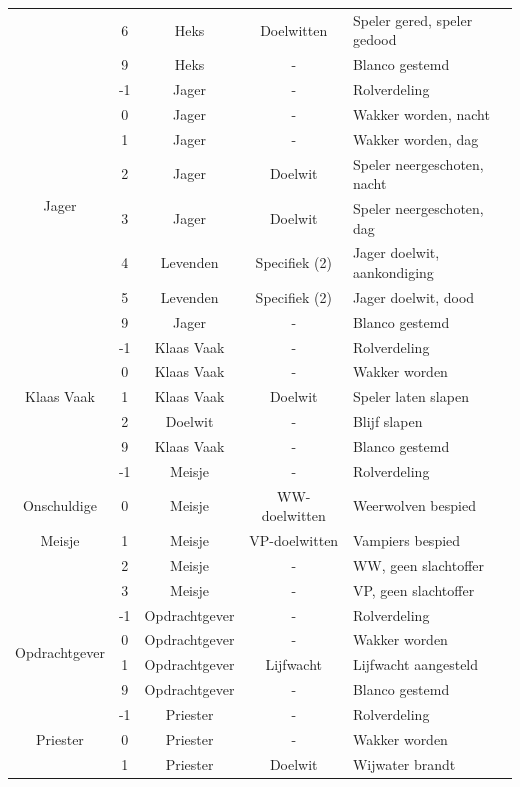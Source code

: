 \documentclass[12pt]{article}
\begin{document}
\begin{center}
\begin{longtable}{c|c|c|c|l}
       & 6 & Heks & Doelwitten & Speler gered, speler gedood \\
       & 9 & Heks & - & Blanco gestemd \\
      \hline
      \multirow{8}{*}{Jager} & -1 & Jager & - & Rolverdeling \\
       & 0 & Jager & - & Wakker worden, nacht \\
       & 1 & Jager & - & Wakker worden, dag \\
       & 2 & Jager & Doelwit & Speler neergeschoten, nacht \\
       & 3 & Jager & Doelwit & Speler neergeschoten, dag \\
       & 4 & Levenden & Specifiek (2) & Jager doelwit, aankondiging \\
       & 5 & Levenden & Specifiek (2) & Jager doelwit, dood \\
       & 9 & Jager & - & Blanco gestemd \\
      \hline
      \multirow{5}{*}{Klaas Vaak} & -1 & Klaas Vaak & - & Rolverdeling \\
       & 0 & Klaas Vaak & - & Wakker worden \\
       & 1 & Klaas Vaak & Doelwit & Speler laten slapen \\
       & 2 & Doelwit & - & Blijf slapen \\
       & 9 & Klaas Vaak & - & Blanco gestemd \\
      \hline
       & -1 & Meisje & - & Rolverdeling \\
      Onschuldige & 0 & Meisje & WW-doelwitten & Weerwolven bespied \\
      Meisje & 1 & Meisje & VP-doelwitten & Vampiers bespied \\
       & 2 & Meisje & - & WW, geen slachtoffer \\
       & 3 & Meisje & - & VP, geen slachtoffer \\
      \hline
      \multirow{4}{*}{Opdrachtgever} & -1 & Opdrachtgever & - & Rolverdeling \\
       & 0 & Opdrachtgever & - & Wakker worden \\
       & 1 & Opdrachtgever & Lijfwacht & Lijfwacht aangesteld \\
       & 9 & Opdrachtgever & - & Blanco gestemd \\
      \hline
      \multirow{5}{*}{Priester} & -1 & Priester & - & Rolverdeling \\
       & 0 & Priester & - & Wakker worden \\
       & 1 & Priester & Doelwit & Wijwater brandt \\

\end{longtable}
\end{center}
\end{document}
